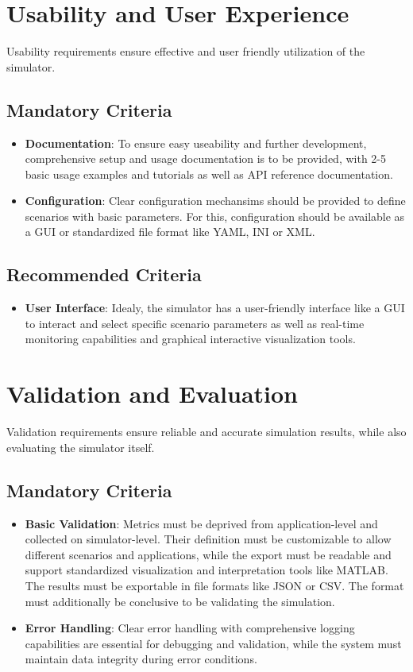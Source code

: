 \section{Usability and User Experience}
Usability requirements ensure effective and user friendly utilization of the simulator.
\subsection{Mandatory Criteria}
\begin{itemize}
  \item \textbf{Documentation}:
        To ensure easy useability and further development, comprehensive setup and usage documentation is to be provided, with 2-5 basic usage examples and tutorials as well as API reference documentation.
  \item \textbf{Configuration}:
        Clear configuration mechansims should be provided to define scenarios with basic parameters.
        For this, configuration should be available as a GUI or standardized file format like YAML, INI or XML.
\end{itemize}
\subsection{Recommended Criteria}
\begin{itemize}
  \item \textbf{User Interface}:
        Idealy, the simulator has a user-friendly interface like a GUI to interact and select specific scenario parameters as well as real-time monitoring capabilities and graphical interactive visualization tools.
\end{itemize}
\section{Validation and Evaluation}
Validation requirements ensure reliable and accurate simulation results, while also evaluating the simulator itself.
\subsection{Mandatory Criteria}
\begin{itemize}
  \item \textbf{Basic Validation}:
        Metrics must be deprived from application-level and collected on simulator-level.
        Their definition must be customizable to allow different scenarios and applications, while the export must be readable and support standardized visualization and interpretation tools like MATLAB.
        The results must be exportable in file formats like JSON or CSV.
        The format must additionally be conclusive to be validating the simulation.
  \item \textbf{Error Handling}:
        Clear error handling with comprehensive logging capabilities are essential for debugging and validation, while the system must maintain data integrity during error conditions.

\end{itemize}
